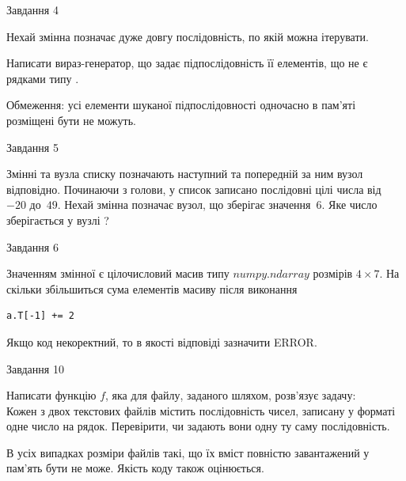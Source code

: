 \documentclass[12pt, ukrainian]{article}
\begin{document}
{               
{\begin{center}Завдання {4}\end{center}}
\vspace{-6mm}
Нехай змінна  позначає дуже довгу послідовність, по якій можна ітерувати.

Написати вираз-генератор, що задає підпослідовність її елементів, що не є рядками типу .

Обмеження: усі елементи шуканої підпослідовності одночасно в пам'яті розміщені бути не можуть.\par

\vspace{10mm}
               
{\begin{center}Завдання {5}\end{center}}
\vspace{-6mm}
Змінні  та  вузла списку позначають наступний та попередній за ним вузол відповідно. Починаючи з голови, у список записано послідовні цілі числа від~$-20$ до~$49$. Нехай змінна  позначає вузол, що зберігає значення~$6$.
Яке число зберігається у вузлі  ?\par

               
{\begin{center}Завдання {6}\end{center}}
\vspace{-6mm}
Значенням змінної  є цілочисловий масив типу $numpy.ndarray$ розмірів $4{\times}7$. На скільки збільшиться сума елементів масиву  після виконання
\begin{verbatim}
a.T[-1] += 2
\end{verbatim}


Якщо код некоректний, то в якості відповіді зазначити ERROR.\par

               
{\begin{center}Завдання {10}\end{center}}
\vspace{-6mm}

Написати функцію $f$, яка для файлу, заданого шляхом, розв’язує задачу:\\ Кожен з двох текстових файлів містить послідовність чисел, записану у форматі одне число на рядок.  Перевірити, чи задають вони одну ту саму послідовність.

В усіх випадках розміри файлів такі, що їх вміст повністю завантажений у пам'ять бути не може. Якість коду також оцінюється.



}
\end{document}
